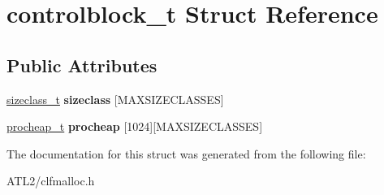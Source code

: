 \hypertarget{structcontrolblock__t}{\section{controlblock\+\_\+t Struct Reference}
\label{structcontrolblock__t}
}
\subsection*{Public Attributes}
\begin{DoxyCompactItemize}
\item 
\hypertarget{structcontrolblock__t_a7eaf2b292648a87e77ba71b015f896d1}{\hyperlink{structsizeclass}{sizeclass\+\_\+t} {\bfseries sizeclass} \mbox{[}M\+A\+X\+S\+I\+Z\+E\+C\+L\+A\+S\+S\+E\+S\mbox{]}}\label{structcontrolblock__t_a7eaf2b292648a87e77ba71b015f896d1}

\item 
\hypertarget{structcontrolblock__t_a0a9fe1195ebac4cb4c1f5eb915a309d3}{\hyperlink{structprocheap}{procheap\+\_\+t} {\bfseries procheap} \mbox{[}1024\mbox{]}\mbox{[}M\+A\+X\+S\+I\+Z\+E\+C\+L\+A\+S\+S\+E\+S\mbox{]}}\label{structcontrolblock__t_a0a9fe1195ebac4cb4c1f5eb915a309d3}

\end{DoxyCompactItemize}


The documentation for this struct was generated from the following file\+:\begin{DoxyCompactItemize}
\item 
A\+T\+L2/clfmalloc.\+h\end{DoxyCompactItemize}
